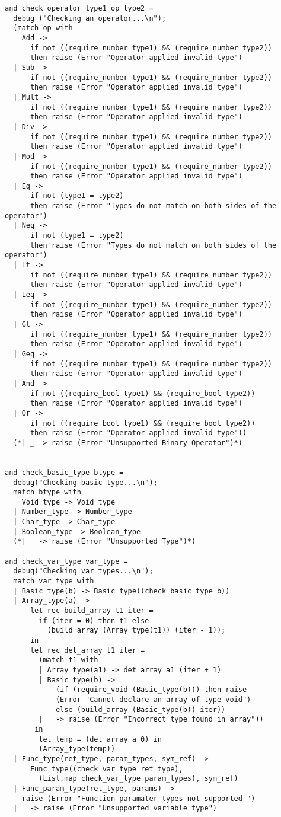 \begin{verbatim}
and check_operator type1 op type2 =
  debug ("Checking an operator...\n");
  (match op with
    Add ->
      if not ((require_number type1) && (require_number type2))
      then raise (Error "Operator applied invalid type")
  | Sub ->
      if not ((require_number type1) && (require_number type2))
      then raise (Error "Operator applied invalid type")
  | Mult ->
      if not ((require_number type1) && (require_number type2))
      then raise (Error "Operator applied invalid type")
  | Div ->
      if not ((require_number type1) && (require_number type2))
      then raise (Error "Operator applied invalid type")
  | Mod ->
      if not ((require_number type1) && (require_number type2))
      then raise (Error "Operator applied invalid type")
  | Eq ->
      if not (type1 = type2)
      then raise (Error "Types do not match on both sides of the operator")
  | Neq ->
      if not (type1 = type2)
      then raise (Error "Types do not match on both sides of the operator")
  | Lt ->
      if not ((require_number type1) && (require_number type2))
      then raise (Error "Operator applied invalid type")
  | Leq ->
      if not ((require_number type1) && (require_number type2))
      then raise (Error "Operator applied invalid type")
  | Gt ->
      if not ((require_number type1) && (require_number type2))
      then raise (Error "Operator applied invalid type")
  | Geq ->
      if not ((require_number type1) && (require_number type2))
      then raise (Error "Operator applied invalid type")
  | And ->
      if not ((require_bool type1) && (require_bool type2))
      then raise (Error "Operator applied invalid type")
  | Or ->
      if not ((require_bool type1) && (require_bool type2))
      then raise (Error "Operator applied invalid type"))
  (*| _ -> raise (Error "Unsupported Binary Operator")*)


and check_basic_type btype =
  debug("Checking basic type...\n");
  match btype with
    Void_type -> Void_type
  | Number_type -> Number_type
  | Char_type -> Char_type
  | Boolean_type -> Boolean_type
  (*| _ -> raise (Error "Unsupported Type")*)

and check_var_type var_type =
  debug("Checking var_types...\n");
  match var_type with
  | Basic_type(b) -> Basic_type((check_basic_type b))
  | Array_type(a) ->
      let rec build_array t1 iter =
        if (iter = 0) then t1 else
          (build_array (Array_type(t1)) (iter - 1));
      in
      let rec det_array t1 iter =
        (match t1 with
        | Array_type(a1) -> det_array a1 (iter + 1)
        | Basic_type(b) ->
            (if (require_void (Basic_type(b))) then raise
            (Error "Cannot declare an array of type void")
            else (build_array (Basic_type(b)) iter))
        | _ -> raise (Error "Incorrect type found in array"))
       in
        let temp = (det_array a 0) in
        (Array_type(temp))
  | Func_type(ret_type, param_types, sym_ref) ->
      Func_type((check_var_type ret_type),
        (List.map check_var_type param_types), sym_ref)
  | Func_param_type(ret_type, params) ->
    raise (Error "Function paramater types not supported ")
  | _ -> raise (Error "Unsupported variable type")


\end{verbatim}
